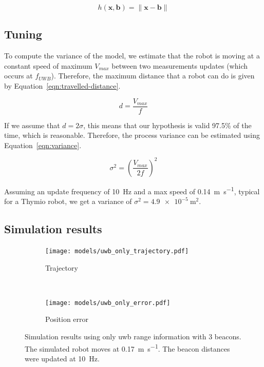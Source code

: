 \documentclass[a4paper, 12pt]{scrreprt}
\begin{document}
\begin{equation}
    h(\mathbf{x}, \mathbf{b}) = \lVert \mathbf{x} - \mathbf{b} \rVert
\label{eqn:uwb-only-measurement}
\end{equation}

\subsection{Tuning}

To compute the variance of the model, we estimate that the robot is moving at a constant speed of maximum $V_{max}$ between two measurements updates (which occurs at \(f_{UWB}\)).
Therefore, the maximum distance that a robot can do is given by Equation~\ref{eqn:travelled-distance}.

\begin{equation}
d = \frac{V_{max}}{f}
\label{eqn:travelled-distance}
\end{equation}

If we assume that \(d = 2 \sigma\), this means that our hypothesis is valid 97.5\% of the time, which is reasonable.
Therefore, the process variance can be estimated using Equation~\ref{eqn:variance}.

\begin{equation}
\sigma^2 = \left( \frac{V_{max}}{2 f} \right)^2
\label{eqn:variance}
\end{equation}

Assuming an update frequency of \SI{10}{\hertz} and a max speed of \SI{0.14}{\meter\per\second}, typical for a Thymio robot\cite{thymioweb}, we get a variance of $\sigma^2 = \SI{4.9e-5}{\meter\squared}$.


\subsection{Simulation results}

\begin{figure}[htpb]
    \centering
    \begin{subfigure}[t]{0.4\textwidth}
        \texttt{[image: models/uwb\_only\_trajectory.pdf]}
        \caption{Trajectory}
    \end{subfigure}%
    ~
    \begin{subfigure}[t]{0.4\textwidth}
        \texttt{[image: models/uwb\_only\_error.pdf]}
        \caption{Position error}
    \end{subfigure}
    \caption{
        Simulation results using only \gls{uwb} range information with 3 beacons.
        The simulated robot moves at \SI{0.17}{\meter\per\second}.
        The beacon distances were updated at \SI{10}{\hertz}.
        \label{fig:uwb_only}
    }
\end{figure}
\end{document}
